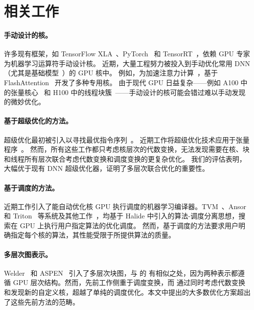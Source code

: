 \section{相关工作}
\label{sec:related}

\paragraph{手动设计的核。}许多现有框架，如 TensorFlow XLA~\cite{tensorflow_xla, Tensorflow}、PyTorch~\cite{pytorch} 和 TensorRT~\cite{tensorrt}，依赖 GPU 专家为机器学习运算符手动设计核。
近期，大量工程努力被投入到手动优化常用 DNN（尤其是基础模型~\cite{bommasani2022opportunities}）的 GPU 核中。
例如，为加速注意力计算~\cite{transformers}，基于 FlashAttention~\cite{dao2023flash, tri2023flashdecoding, hong2024flashdecoding, fastertransformer} 开发了多种专用核。
由于现代 GPU 日益复杂——例如 A100 中的张量核心~\cite{Markidis2018tensorcores} 和 H100 中的线程块簇~\cite{nvidia-h100}——手动设计的核可能会错过难以手动发现的微妙优化。

\paragraph{基于超级优化的方法。}超级优化最初被引入以寻找最优指令序列~\cite{massalin, stoke, peephole}。
近期工作将超级优化技术应用于张量程序~\cite{TASO, wang2021pet, zheng2023einnet, tensat, unger2022unity, FlexFlow, hu2024korch, jeon2025graphpipe}。
然而，所有这些工作都只考虑核层次的代数变换，无法发现需要在核、块和线程所有层次联合考虑代数变换和调度变换的更复杂优化。
我们的评估表明，\sys 大幅优于现有 DNN 超级优化器，证明了多层次联合优化的重要性。

\paragraph{基于调度的方法。}近期工作引入了能自动优化核 GPU 执行调度的机器学习编译器。TVM~\cite{tvm, tvm_auto_tuner}、Ansor~\cite{ansor} 和 Triton~\cite{tillet2019triton} 等系统及其他工作~\cite{zheng2020flextensor, hagedorn2023graphene, feng2022tensorir}，均基于 Halide 中引入的算法-调度分离思想，搜索在 GPU 上执行用户指定算法的优化调度。
然而，基于调度的方法要求用户明确指定每个核的算法，其性能受限于所提供算法的质量。

\paragraph{多层次图表示。}Welder~\cite{shi2023welder} 和 ASPEN~\cite{park2023aspen} 引入了多层次块图，与 \sys 的 \graphs 有相似之处，因为两种表示都遵循 GPU 层次结构。然而，先前工作侧重于调度变换，而 \sys 通过同时考虑代数变换和发现新的自定义核，超越了单纯的调度优化。本文中提出的大多数优化方案超出了这些先前方法的范畴。

